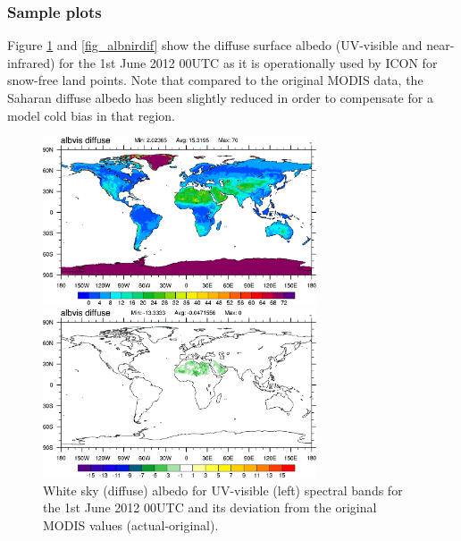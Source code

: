 \documentclass[a4paper,11pt]{article}
\begin{document}
\subsubsection{Sample plots}
Figure \ref{fig_albvisdif} and \ref{fig_albnirdif} show the diffuse surface albedo (UV-visible and near-infrared) for the 1st June 2012 00UTC as it is 
operationally used by ICON for snow-free land points. Note that compared to the original MODIS data, the Saharan diffuse albedo has been slightly reduced 
in order to compensate for a model cold bias in that region.
\begin{figure}[ht]
\begin{minipage}[t]{\textwidth}
  \begin{minipage}[t]{0.498\textwidth}
    \center
    \includegraphics[width=8.1cm]{albvisdif_20120601_tuned.png}
  \end{minipage}
  \begin{minipage}[t]{0.498\textwidth}
    \center
    \includegraphics[width=8.1cm]{albvisdif_20120601_tuned-untuned.png}
  \end{minipage}
\end{minipage}
\caption{White sky (diffuse) albedo for UV-visible (left) spectral bands for the 1st June 2012 00UTC and its deviation from the original MODIS values (actual-original).}\label{fig_albvisdif}
\end{figure}
\end{document}
